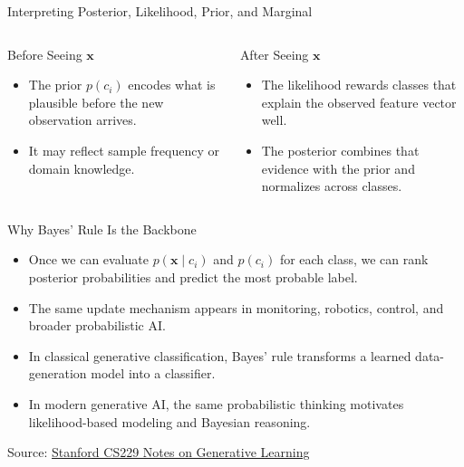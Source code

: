 \documentclass[10pt]{beamer}
\begin{document}
\begin{frame}{Interpreting Posterior, Likelihood, Prior, and Marginal}
  \justifying
  \begin{columns}[T]
    \begin{conceptbox}{Before Seeing $\bm{x}$}
      \begin{itemize}
        \item The prior $p(c_i)$ encodes what is plausible before the new observation arrives.
        \item It may reflect sample frequency or domain knowledge.
      \end{itemize}
    \end{conceptbox}
    \begin{examplebox}{After Seeing $\bm{x}$}
      \begin{itemize}
        \item The likelihood rewards classes that explain the observed feature vector well.
        \item The posterior combines that evidence with the prior and normalizes across classes.
      \end{itemize}
    \end{examplebox}
  \end{columns}
\end{frame}

\begin{frame}{Why Bayes' Rule Is the Backbone}
  \justifying
  \begin{itemize}
    \item Once we can evaluate $p(\bm{x}\mid c_i)$ and $p(c_i)$ for each class, we can rank posterior probabilities and predict the most probable label.
    \item The same update mechanism appears in monitoring, robotics, control, and broader probabilistic AI.
    \item In classical generative classification, Bayes' rule transforms a learned data-generation model into a classifier.
    \item In modern generative AI, the same probabilistic thinking motivates likelihood-based modeling and Bayesian reasoning.
  \end{itemize}
  \vspace{0.3em}
  {\footnotesize Source: \href{https://cs229.stanford.edu/notes2020fall/cs229-notes2.pdf}{Stanford CS229 Notes on Generative Learning}}
\end{frame}
\end{document}
